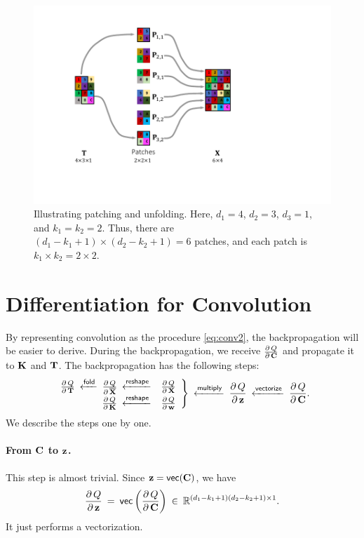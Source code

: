 \documentclass[11pt]{article}
\numberwithin{equation}{section}
\def\C{{\bf C}}
\def\K{{\bf K}}
\def\T{{\bf T}}
\def\w{{\bf w}}
\def\X{{\bf X}}
\def\z{{\bf z}}
\def\RB{{\mathbb R}}
\def\vect{\mathsf{vec}}
\begin{document}
\begin{figure}[!h]
	\centering
	\includegraphics[width=0.7\linewidth]{figures/unfold.pdf}
	\caption{Illustrating patching and unfolding. Here, $d_1=4$, $d_2=3$, $d_3=1$, and $k_1=k_2=2$.
	Thus, there are $(d_1-k_1+1)\times (d_2-k_2+1) = 6$ patches, and each patch is $k_1\times k_2 = 2\times 2$.}
	\label{fig:unfold}
\end{figure}

\section{Differentiation for Convolution}


By representing convolution as the procedure \eqref{eq:conv2}, the backpropagation will be easier to derive.
During the backpropagation, we receive $\frac{\partial \, Q}{\partial \, \C}$ and propagate it to $\K$ and $\T$.
The backpropagation has the following steps:
\begin{equation} \label{eq:conv2}
    \left.
    \begin{array}{r c}
         \frac{\partial \, Q}{\partial \, \T} \: \xleftarrow{\textsf{fold}} \: \frac{\partial \, Q}{\partial \, \overline{\X}} \: \xleftarrow{\textsf{reshape}}  & \frac{\partial \, Q}{\partial \, \X} \\
         \frac{\partial \, Q}{\partial \, \K} \: \xleftarrow{\textsf{reshape}} & \frac{\partial \, Q}{\partial \, \w}  \\
    \end{array}
    \right\}
    \: \xleftarrow{\textsf{multiply}}  \: 
    \frac{\partial \, Q}{\partial \, \z}
    \: \xleftarrow{\textsf{vectorize}}  \: 
    \frac{\partial \, Q}{\partial \, \C} .
\end{equation}
We describe the steps one by one.


\paragraph{From $\C$ to $\z$.}
This step is almost trivial.
Since $\z = \vect (\C)$, we have
\begin{equation*}
    \frac{\partial \, Q}{\partial \, \z}
    \: = \: \vect \left( \frac{\partial \, Q}{\partial \, \C} \right) 
    \: \in \: \RB^{(d_1-k_1+1)(d_2-k_2+1) \times 1} .
\end{equation*}
It just performs a vectorization.
\end{document}
